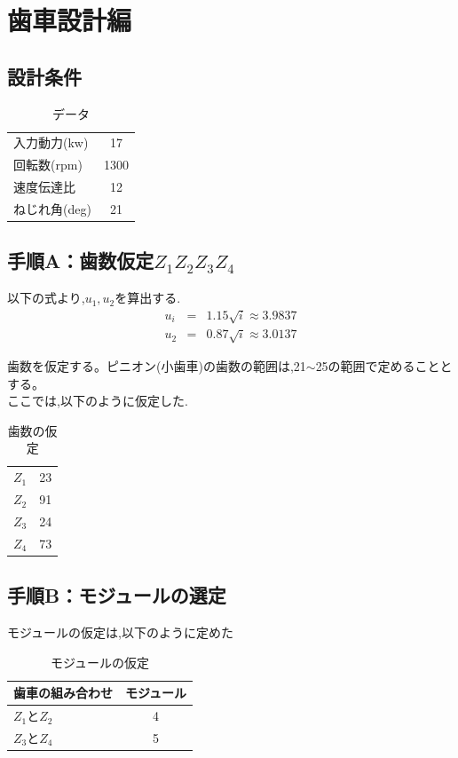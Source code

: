 \chapter{歯車設計編}

\section{設計条件}
\begin{table}[htb]
\begin{center}
  \caption{データ}
  \begin{tabular}{lc} \hline
    入力動力(kw)&17\\
    回転数(rpm)&1300\\
    速度伝達比&12\\
    ねじれ角(deg)&21\\
    \hline
  \end{tabular}
\end{center}
\end{table}

\section{手順A：歯数仮定$Z_1Z_2Z_3Z_4$ }
以下の式より,$u_1,u_2$を算出する.
\begin{eqnarray}
u_i&=&1.15 \sqrt i \approx 3.9837\nonumber\\
u_2&=&0.87 \sqrt i \approx 3.0137 \nonumber
\end{eqnarray}

歯数を仮定する。ピニオン(小歯車)の歯数の範囲は,21$\sim$25の範囲で定めることとする。\\
ここでは,以下のように仮定した.
\begin{table}[htb]
\begin{center}
  \caption{歯数の仮定}
  \begin{tabular}{|l|c|} \hline
    $Z_1$&23\\
    $Z_2$&91\\
    $Z_3$&24\\
    $Z_4$&73\\
    \hline
  \end{tabular}
\end{center}
\end{table}

\section{手順B：モジュールの選定}
モジュールの仮定は,以下のように定めた
\begin{table}[htb]
\begin{center}
  \caption{モジュールの仮定}
  \begin{tabular}{|l|c|} \hline
    歯車の組み合わせ&モジュール\\\hline
    $Z_1とZ_2$&4\\
    $Z_3とZ_4$&5\\
    \hline
  \end{tabular}
\end{center}
\end{table}

